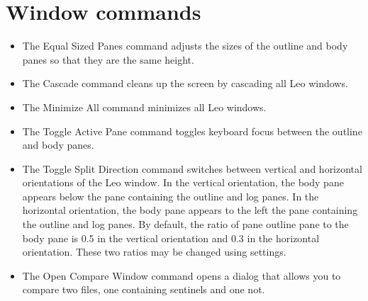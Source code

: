 \documentclass[a4paper,10pt,english]{sphinxmanual}
\begin{document}
\section{Window commands}
\label{commands:window-commands}\begin{itemize}
\item {} 
The Equal Sized Panes command adjusts the sizes of the outline and body
panes so that they are the same height.

\item {} 
The Cascade command cleans up the screen by cascading all Leo windows.

\item {} 
The Minimize All command minimizes all Leo windows.

\item {} 
The Toggle Active Pane command toggles keyboard focus between the outline and body panes.

\item {} 
The Toggle Split Direction command switches between vertical and horizontal
orientations of the Leo window. In the vertical orientation, the body pane
appears below the pane containing the outline and log panes. In the horizontal
orientation, the body pane appears to the left the pane containing the outline
and log panes. By default, the ratio of pane outline pane to the body pane is
0.5 in the vertical orientation and 0.3 in the horizontal orientation. These two
ratios may be changed using settings.

\item {} 
The Open Compare Window command opens a dialog that allows you to compare
two files, one containing sentinels and one not.

\end{itemize}
\end{document}
